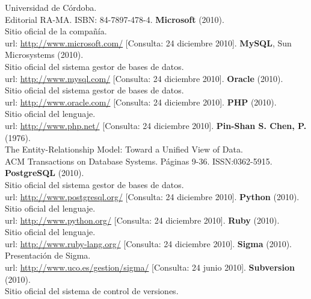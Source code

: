 \begin{thebibliography}{xx}
         Universidad de Córdoba.\\
         Editorial RA-MA. ISBN: 84-7897-478-4.
 \textbf{Microsoft} (2010).\\
         Sitio oficial de la compañía.\\
         url: \url{http://www.microsoft.com/}
         [Consulta: 24 diciembre 2010].
 \textbf{MySQL}, Sun Microsystems (2010).\\
         Sitio oficial del sistema gestor de bases de datos.\\
         url: \url{http://www.mysql.com/}
         [Consulta: 24 diciembre 2010].
 \textbf{Oracle} (2010).\\
         Sitio oficial del sistema gestor de bases de datos.\\
         url: \url{http://www.oracle.com/}
         [Consulta: 24 diciembre 2010].
 \textbf{PHP} (2010).\\
         Sitio oficial del lenguaje.\\
         url: \url{http://www.php.net/}
         [Consulta: 24 diciembre 2010].
 \textbf{Pin-Shan S. Chen, P.} (1976).\\
         The Entity-Relationship Model: Toward a Unified View of Data. \\
         ACM Transactions on Database Systems. Páginas 9-36.
         ISSN:0362-5915.
 \textbf{PostgreSQL} (2010).\\
         Sitio oficial del sistema gestor de bases de datos.\\
         url: \url{http://www.postgresql.org/}
         [Consulta: 24 diciembre 2010].
 \textbf{Python} (2010).\\
         Sitio oficial del lenguaje.\\
         url: \url{http://www.python.org/}
         [Consulta: 24 diciembre 2010].
 \textbf{Ruby} (2010).\\
         Sitio oficial del lenguaje.\\
         url: \url{http://www.ruby-lang.org/}
         [Consulta: 24 diciembre 2010].
 \textbf{Sigma} (2010).\\
         Presentación de Sigma.\\
         url: \url{http://www.uco.es/gestion/sigma/}
         [Consulta: 24 junio 2010].
 \textbf{Subversion} (2010).\\
         Sitio oficial del sistema de control de versiones.\\

\end{thebibliography}
